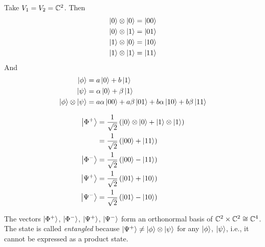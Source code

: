 \begin{example}
    Take $V_1 = V_2 = \mathbb{C}^2$. Then
    \begin{align*}
        \left|0\right\rangle \otimes \left|0\right\rangle & = \left|00\right\rangle \\
        \left|0\right\rangle \otimes \left|1\right\rangle & = \left|01\right\rangle \\
        \left|1\right\rangle \otimes \left|0\right\rangle & = \left|10\right\rangle \\
        \left|1\right\rangle \otimes \left|1\right\rangle & = \left|11\right\rangle \\
    \end{align*}
    And
    \begin{align*}
        \left|\phi\right\rangle                        & = a\left|0\right\rangle + b\left|1\right\rangle                                                 \\
        \left|\psi\right\rangle                        & = \alpha\left|0\right\rangle + \beta\left|1\right\rangle                                        \\
        \left|\phi\right\rangle \otimes \left|\psi\right\rangle & = a\alpha\left|00\right\rangle + a\beta\left|01\right\rangle + b\alpha\left|10\right\rangle + b\beta\left|11\right\rangle
    \end{align*}
\end{example}

\begin{example}
    \begin{align*}
        \left|\Phi^+\right\rangle & = \frac{1}{\sqrt{2}}\left(\left|0\right\rangle\otimes\left|0\right\rangle + \left|1\right\rangle\otimes\left|1\right\rangle\right) \\
                     & = \frac{1}{\sqrt{2}}\left(\left|00\right\rangle + \left|11\right\rangle\right)                                   \\
        \left|\Phi^-\right\rangle & = \frac{1}{\sqrt{2}}\left(\left|00\right\rangle - \left|11\right\rangle\right)                                   \\
        \left|\Psi^+\right\rangle & = \frac{1}{\sqrt{2}}\left(\left|01\right\rangle + \left|10\right\rangle\right)                                   \\
        \left|\Psi^-\right\rangle & = \frac{1}{\sqrt{2}}\left(\left|01\right\rangle - \left|10\right\rangle\right)
    \end{align*}
\end{example}

The vectors $\left|\Phi^+\right\rangle$, $\left|\Phi^-\right\rangle$, $\left|\Psi^+\right\rangle$, $\left|\Psi^-\right\rangle$ form an
orthonormal basis of $\mathbb{C}^2 \times \mathbb{C}^2 \cong \mathbb{C}^4$. The state
is called \emph{entangled} because $\left|\Psi^+\right\rangle \neq \left|\phi\right\rangle \otimes \left|\psi\right\rangle$ for any
$\left|\phi\right\rangle$, $\left|\psi\right\rangle$, i.e., it cannot be expressed as a product state.

